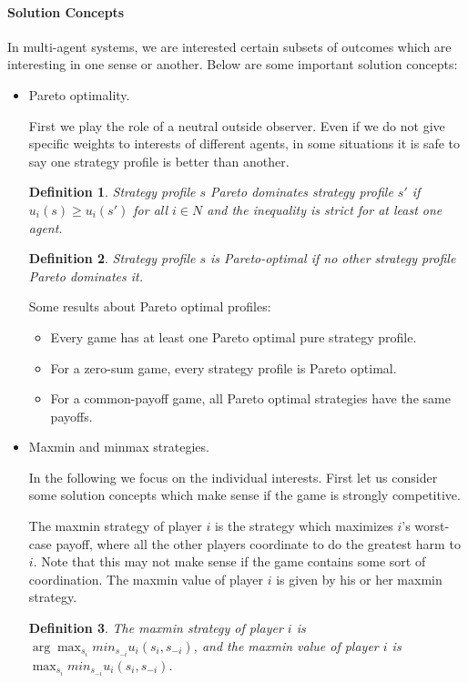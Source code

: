 \documentclass{article}
\newtheorem{definition}{Definition}
\begin{document}
\paragraph{Solution Concepts}
In multi-agent systems, we are interested certain subsets of outcomes which are interesting in one sense or another. Below are some important solution concepts:
\begin{itemize}
\item Pareto optimality. 

First we play the role of a neutral outside observer. Even if we do not give specific weights to interests of different agents, in some situations it is safe to say one strategy profile is better than another.
\begin{definition}
Strategy profile $s$ Pareto dominates strategy profile $s'$ if $u_i(s)\ge u_i(s')$ for all $i\in N$ and the inequality is strict for at least one agent.
\end{definition}
\begin{definition}
Strategy profile $s$ is Pareto-optimal if no other strategy profile Pareto dominates it.
\end{definition}

Some results about Pareto optimal profiles:
\begin{itemize}
\item Every game has at least one Pareto optimal pure strategy profile.
\item For a zero-sum game, every strategy profile is Pareto optimal.
\item For a common-payoff game, all Pareto optimal strategies have the same payoffs.
\end{itemize}

\item Maxmin and minmax strategies.

In the following we focus on the individual interests. First let us consider some solution concepts which make sense if the game is strongly competitive. 

The maxmin strategy of player $i$ is the strategy which maximizes $i$'s worst-case payoff, where all the other players coordinate to do the greatest harm to $i$. Note that this may not make sense if the game contains some sort of coordination. The maxmin value of player $i$ is given by his or her maxmin strategy.

\begin{definition}
The maxmin strategy of player $i$ is $\arg\max_{s_i}min_{s_{-i}}u_i(s_i,s_{-i})$, and the maxmin value of player $i$ is $\max_{s_i}min_{s_{-i}}u_i(s_i,s_{-i})$.
\end{definition}


\end{itemize}
\end{document}
